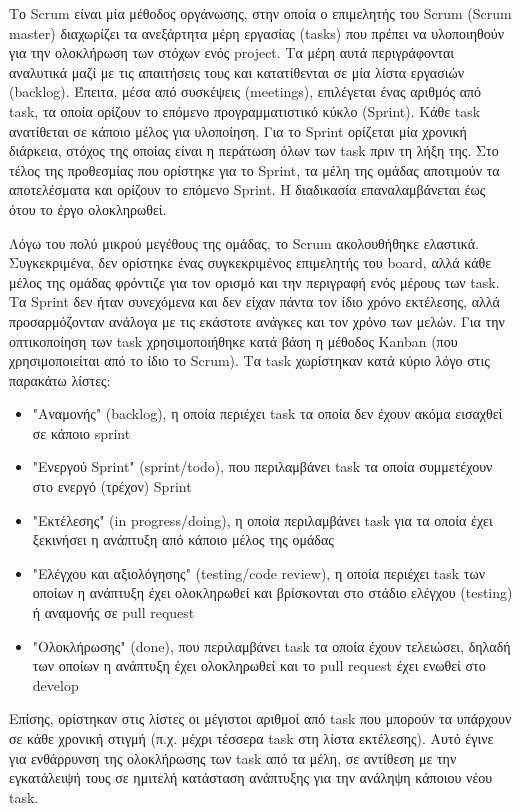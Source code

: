 Το Scrum είναι μία μέθοδος οργάνωσης, στην οποία ο επιμελητής του Scrum (Scrum master) διαχωρίζει τα ανεξάρτητα μέρη εργασίας (tasks) που πρέπει να υλοποιηθούν για την ολοκλήρωση των στόχων ενός project. Τα μέρη αυτά περιγράφονται αναλυτικά μαζί με τις απαιτήσεις τους και κατατίθενται σε μία λίστα εργασιών (backlog). Έπειτα, μέσα από συσκέψεις (meetings), επιλέγεται ένας αριθμός από task, τα οποία ορίζουν το επόμενο προγραμματιστικό κύκλο (Sprint). Κάθε task ανατίθεται σε κάποιο μέλος για υλοποίηση. Για το Sprint ορίζεται μία χρονική διάρκεια, στόχος της οποίας είναι η περάτωση όλων των task πριν τη λήξη της. Στο τέλος της προθεσμίας που ορίστηκε για το Sprint, τα μέλη της ομάδας αποτιμούν τα αποτελέσματα και ορίζουν το επόμενο Sprint. Η διαδικασία επαναλαμβάνεται έως ότου το έργο ολοκληρωθεί.

Λόγω του πολύ μικρού μεγέθους της ομάδας, το Scrum ακολουθήθηκε ελαστικά. Συγκεκριμένα, δεν ορίστηκε ένας συγκεκριμένος επιμελητής του board, αλλά κάθε μέλος της ομάδας φρόντιζε για τον ορισμό και την περιγραφή ενός μέρους των task. Τα Sprint δεν ήταν συνεχόμενα και δεν είχαν πάντα τον ίδιο χρόνο εκτέλεσης, αλλά προσαρμόζονταν ανάλογα με τις εκάστοτε ανάγκες και τον χρόνο των μελών. Για την οπτικοποίηση των task χρησιμοποιήθηκε κατά βάση η μέθοδος Kanban (που χρησιμοποιείται από το ίδιο το Scrum). Τα task χωρίστηκαν κατά κύριο λόγο στις παρακάτω λίστες:

\begin{itemize}
    \item "Αναμονής" (backlog), η οποία περιέχει task τα οποία δεν έχουν ακόμα εισαχθεί σε κάποιο sprint
    \item "Ενεργού Sprint" (sprint/todo), που περιλαμβάνει task τα οποία συμμετέχουν στο ενεργό (τρέχον) Sprint
    \item "Εκτέλεσης" (in progress/doing), η οποία περιλαμβάνει task για τα οποία έχει ξεκινήσει η ανάπτυξη από κάποιο μέλος της ομάδας
    \item "Ελέγχου και αξιολόγησης" (testing/code review), η οποία περιέχει task των οποίων η ανάπτυξη έχει ολοκληρωθεί και βρίσκονται στο στάδιο ελέγχου (testing) ή αναμονής σε pull request
    \item "Ολοκλήρωσης" (done), που περιλαμβάνει task τα οποία έχουν τελειώσει, δηλαδή των οποίων η ανάπτυξη έχει ολοκληρωθεί και το pull request έχει ενωθεί στο develop
\end{itemize}

Επίσης, ορίστηκαν στις λίστες οι μέγιστοι αριθμοί από task που μπορούν τα υπάρχουν σε κάθε χρονική στιγμή (π.χ. μέχρι τέσσερα task στη λίστα εκτέλεσης). Αυτό έγινε για ενθάρρυνση της ολοκλήρωσης των task από τα μέλη, σε αντίθεση με την εγκατάλειψή τους σε ημιτελή κατάσταση ανάπτυξης για την ανάληψη κάποιου νέου task.

